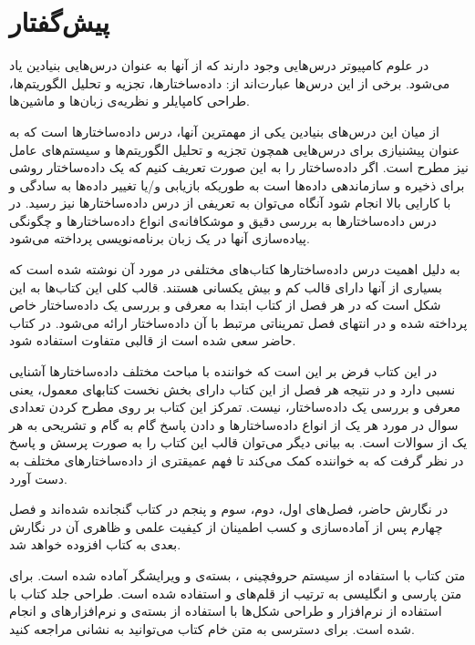 \section*{پیش‌گفتار}
در علوم کامپیوتر درس‌هایی وجود دارند که از آنها به عنوان درس‌هایی بنیادین یاد می‌شود. برخی از این درس‌ها عبارت‌اند از: داده‌ساختارها، تجزیه و تحلیل الگوریتم‌ها، طراحی کامپایلر و نظریه‌ی زبان‌ها و ماشین‌ها.

از میان این درس‌های بنیادین یکی از مهمترین آنها، درس داده‌ساختارها است که به عنوان پیشنیازی برای درس‌هایی همچون تجزیه و تحلیل الگوریتم‌ها و سیستم‌های عامل نیز مطرح است. اگر داده‌ساختار را به این صورت تعریف کنیم که {\prq}یک داده‌ساختار روشی برای ذخیره و سازماندهی داده‌ها است به طوریکه بازیابی و/یا تغییر داده‌ها به سادگی و با کارایی بالا انجام شود{\plq} آنگاه می‌توان به تعریفی از درس داده‌ساختارها نیز رسید. در درس داده‌ساختارها به بررسی دقیق و موشکافانه‌ی انواع داده‌ساختارها و چگونگی پیاده‌سازی آنها در یک زبان برنامه‌نویسی پرداخته می‌شود.

به دلیل اهمیت درس داده‌ساختارها کتاب‌های مختلفی در مورد آن نوشته شده است که بسیاری از آنها دارای قالب کم و بیش یکسانی هستند. قالب کلی این کتاب‌ها به این شکل است که در هر فصل از کتاب ابتدا به معرفی و بررسی یک داده‌ساختار خاص پرداخته شده و در انتهای فصل تمریناتی مرتبط با آن داده‌ساختار ارائه می‌شود. در کتاب حاضر سعی شده است از قالبی متفاوت استفاده شود.

در این کتاب فرض بر این است که خواننده با مباحث مختلف داده‌ساختارها آشنایی نسبی دارد و در نتیجه هر فصل از این کتاب دارای بخش نخست کتابهای معمول، یعنی معرفی و بررسی یک داده‌ساختار، نیست. تمرکز این کتاب بر روی مطرح کردن تعدادی سوال در مورد هر یک از انواع داده‌ساختارها و دادن پاسخ گام به گام و تشریحی به هر یک از سوالات است. به بیانی دیگر می‌توان قالب این کتاب را به صورت پرسش و پاسخ در نظر گرفت که به خواننده کمک می‌کند تا فهم عمیقتری از داده‌ساختارهای مختلف به دست آورد.

در نگارش حاضر، فصل‌های اول، دوم، سوم و پنجم در کتاب گنجانده شده‌اند و فصل چهارم پس از آماده‌سازی و کسب اطمینان از کیفیت علمی و ظاهری آن در نگارش‌ بعدی به کتاب افزوده خواهد شد.

متن کتاب با استفاده از سیستم حروفچینی {\lr{\LaTeX}}، بسته‌ی {\lr{\XePersian}} و ویرایشگر {} آماده شده است. برای  متن پارسی و انگلیسی به ترتیب از قلم‌های {} و {} استفاده شده است. طراحی جلد کتاب با استفاده از نرم‌افزار {} و طراحی شکل‌ها با استفاده از بسته‌ی {} و نرم‌افزارهای {} و {} انجام شده است. برای دسترسی به متن خام کتاب می‌توانید به نشانی  {} مراجعه کنید.

